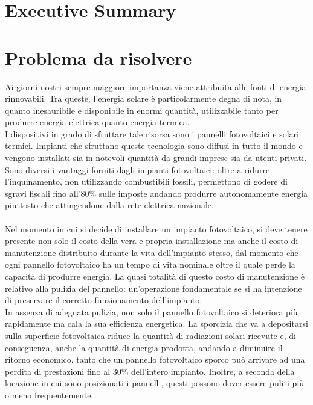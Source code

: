 \documentclass[a4paper, 12pt]{article}
\begin{document}
	
	
	\linespread{1}
	
	
	\tableofcontents
	\newpage
	
	\section{Executive Summary}
	\newpage
	\section{Problema da risolvere}
	Ai giorni nostri sempre maggiore importanza viene attribuita alle fonti di energia rinnovabili. Tra queste, l'energia solare è particolarmente degna di nota, in quanto inesauribile e disponibile in enormi quantità, utilizzabile tanto per produrre energia elettrica quanto energia termica.\\
	I dispositivi in grado di sfruttare tale risorsa sono i pannelli fotovoltaici e solari termici. Impianti che sfruttano queste tecnologia sono diffusi in tutto il mondo e vengono installati sia in notevoli quantità da grandi imprese sia da utenti privati. Sono diversi i vantaggi forniti dagli impianti fotovoltaici: oltre a ridurre l'inquinamento, non utilizzando combustibili fossili, permettono di godere di sgravi fiscali fino all'80\% sulle imposte andando produrre autonomamente energia piuttosto che attingendone dalla rete elettrica nazionale.\\\\
	Nel momento in cui si decide di installare un impianto fotovoltaico, si deve tenere presente non solo il costo della vera e propria installazione ma anche il costo di manutenzione distribuito durante la vita dell'impianto stesso, dal momento che ogni pannello fotovoltaico ha un tempo di vita nominale oltre il quale perde la capacità di produrre energia. La quasi totalità di questo costo di manutenzione è relativo alla pulizia del pannello: un'operazione fondamentale se si ha intenzione di preservare il corretto funzionamento dell'impianto.\\
	In assenza di adeguata pulizia, non solo il pannello fotovoltaico si deteriora più rapidamente ma cala la sua efficienza energetica. La sporcizia che va a depositarsi sulla superficie fotovoltaica riduce la quantità di radiazioni solari ricevute e, di conseguenza, anche la quantità di energia prodotta, andando a diminuire il ritorno economico, tanto che un pannello fotovoltaico sporco può arrivare ad una perdita di prestazioni fino al 30\% dell'intero impianto. Inoltre, a seconda della locazione in cui sono posizionati i pannelli, questi possono dover essere puliti più o meno frequentemente.\\
\end{document}
